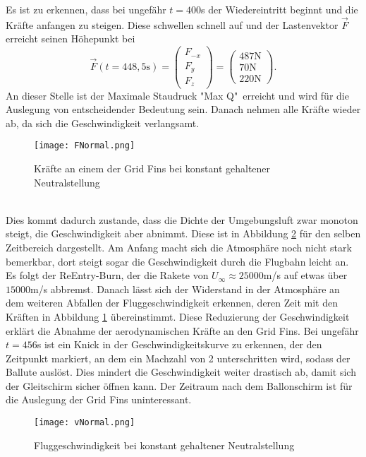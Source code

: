 Es ist zu erkennen, dass bei ungefähr $t=400$s der Wiedereintritt beginnt und die Kräfte anfangen zu steigen. Diese schwellen schnell auf und der Lastenvektor $\vec{F}$ erreicht seinen Höhepunkt bei
\begin{equation}
	\vec{F}(t=448,5\mathrm{s})=
		\left(\begin{array}{c}F_{-x}\\F_y\\F_z\end{array}\right)
			=\left(\begin{array}{c}487\mathrm{N}\\70\mathrm{N}\\220\mathrm{N}\end{array}\right).
\end{equation}
An dieser Stelle ist der Maximale Staudruck "Max Q"\ erreicht und wird für die Auslegung von entscheidender Bedeutung sein. Danach nehmen alle Kräfte wieder ab, da sich die Geschwindigkeit verlangsamt. 
\begin{figure}[h]
	\centering
	\texttt{[image: FNormal.png]}
	\caption{Kräfte an einem der Grid Fins bei konstant gehaltener Neutralstellung}
	\label{abb_KraefteNormal}
\end{figure}\\
Dies kommt dadurch zustande, dass die Dichte der Umgebungsluft zwar monoton steigt, die Geschwindigkeit aber abnimmt. Diese ist in Abbildung \ref{abb_vNormal} für den selben Zeitbereich dargestellt. Am Anfang macht sich die Atmosphäre noch nicht stark bemerkbar, dort steigt sogar die Geschwindigkeit durch die Flugbahn leicht an. Es folgt der ReEntry-Burn, der die Rakete von $U_\infty \approx 25000$m/s auf etwas über $15000$m/s abbremst. Danach lässt sich der Widerstand in der Atmosphäre an dem weiteren Abfallen der Fluggeschwindigkeit erkennen, deren Zeit mit den Kräften in Abbildung \ref{abb_KraefteNormal} übereinstimmt. Diese Reduzierung der Geschwindigkeit erklärt die Abnahme der aerodynamischen Kräfte an den Grid Fins. Bei ungefähr $t=456$s ist ein Knick in der Geschwindigkeitskurve zu erkennen, der den Zeitpunkt markiert, an dem ein Machzahl von 2 unterschritten wird, sodass der Ballute auslöst. Dies mindert die Geschwindigkeit weiter drastisch ab, damit sich der Gleitschirm sicher öffnen kann. Der Zeitraum nach dem Ballonschirm ist für die Auslegung der Grid Fins uninteressant.
\begin{figure}[h]
	\centering
	\texttt{[image: vNormal.png]}
	\caption{Fluggeschwindigkeit bei konstant gehaltener Neutralstellung}
	\label{abb_vNormal}
\end{figure}\\~\\
